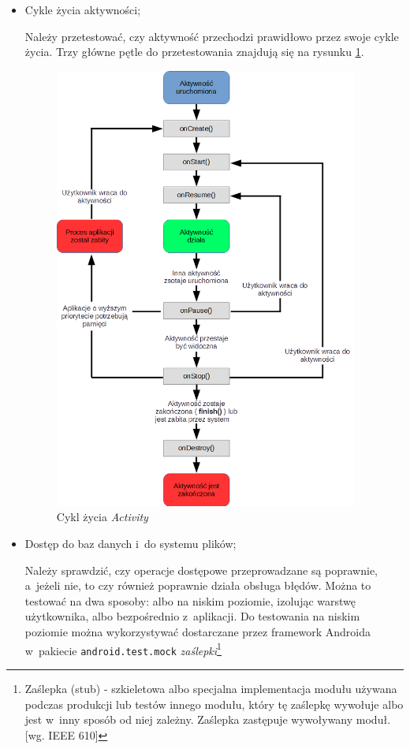 \begin{itemize}
\item{Cykle życia aktywności;}

Należy przetestować, czy aktywność przechodzi prawidłowo przez swoje cykle życia. Trzy główne pętle do przetestowania znajdują się na rysunku \ref{fig:sample_figure}.
\begin{figure}[!htb]
    \centering
    \includegraphics[width=10cm]{imgs/ch2_activity_lifecycle.png}
    \caption{Cykl życia \textit{Activity} \cite{website:android:aktywnosci}}
    \label{fig:sample_figure}
\end{figure} 

\item{Dostęp do baz danych i~do systemu plików;}

Należy sprawdzić, czy operacje dostępowe przeprowadzane są poprawnie, a~jeżeli nie, to czy również poprawnie działa obsługa błędów. Można to testować na dwa sposoby: albo na niskim poziomie, izolując warstwę użytkownika, albo bezpośrednio z~aplikacji. Do testowania na niskim poziomie można wykorzystywać dostarczane przez framework Androida w~pakiecie \texttt{android.test.mock} \textit{zaślepki}\footnote{Zaślepka (stub) - szkieletowa albo specjalna implementacja modułu używana podczas produkcji lub testów innego modułu, który tę zaślepkę wywołuje albo jest w~inny sposób od niej zależny. Zaślepka zastępuje wywoływany moduł. [wg. IEEE 610]}


\end{itemize}
